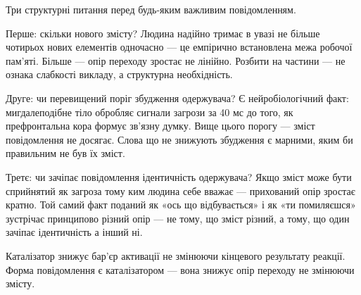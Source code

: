 \documentclass[12pt, a4paper, openany]{book}
\begin{document}
Три структурні питання перед будь-яким важливим повідомленням.

Перше: скільки нового змісту? Людина надійно тримає в увазі не більше чотирьох нових елементів одночасно --- це емпірично встановлена межа робочої пам'яті. Більше --- опір переходу зростає не лінійно. Розбити на частини — не ознака слабкості викладу, а структурна необхідність.

Друге: чи перевищений поріг збудження одержувача? Є нейробіологічний факт: мигдалеподібне тіло обробляє сигнали загрози за 40 мс до того, як префронтальна кора формує зв'язну думку. Вище цього порогу --- зміст повідомлення не досягає. Слова що не знижують збудження є марними, яким би правильним не був їх зміст.

Третє: чи зачіпає повідомлення ідентичність одержувача? Якщо зміст може бути сприйнятий як загроза тому ким людина себе вважає --- прихований опір зростає кратно. Той самий факт поданий як «ось що відбувається» і як «ти помиляєшся» зустрічає принципово різний опір --- не тому, що зміст різний, а тому, що один зачіпає ідентичність а інший ні.

\begin{analogybox}
Каталізатор знижує бар'єр активації не змінюючи кінцевого результату реакції. Форма повідомлення є каталізатором --- вона знижує опір переходу не змінюючи змісту.
\end{analogybox}
\end{document}
